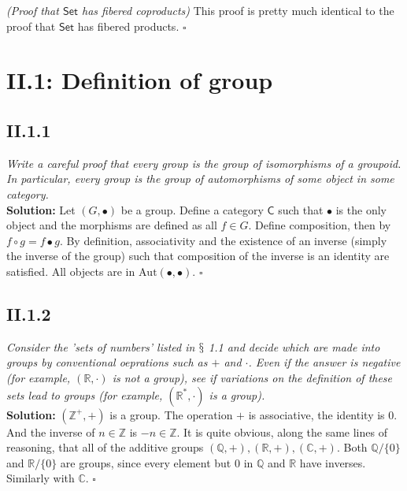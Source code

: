 \documentclass[11pt,a4paper]{article}
\begin{document}
\noindent \textit{(Proof that $\textsf{Set}$ has fibered coproducts)} This proof is pretty much identical to the proof that $\textsf{Set}$ has fibered products. $\square$ 

\newpage

\section*{II.1: Definition of group}

\subsection*{II.1.1} \textit{Write a careful proof that every group is the group of isomorphisms of a groupoid.  In particular, every group is the group of automorphisms of some object in some category.} \\

\noindent \textbf{Solution:} Let $(G, \bullet)$ be a group.  Define a category $\textsf{C}$ such that $\bullet$ is the only object and the morphisms are defined as all $f \in G$.  Define composition, then by $f \circ g = f \bullet g$.  By definition, associativity and the existence of an inverse (simply the inverse of the group) such that composition of the inverse is an identity are satisfied.  All objects are in $\text{Aut}(\bullet,\bullet)$. $\square$ 

\subsection*{II.1.2} \textit{Consider the 'sets of numbers' listed in $\mathsection$ 1.1 and decide which are made into groups by conventional oeprations such as $+$ and $\cdot$.  Even if the answer is negative (for example, $(\mathbb{R}, \cdot)$ is not a group), see if variations on the definition of these sets lead to groups (for example, $(\mathbb{R}^*, \cdot)$ is a group).} \\

\noindent \textbf{Solution: } $(\mathbb{Z}^+, +)$ is a group.  The operation $+$ is associative, the identity is $0$.  And the inverse of $n \in \mathbb{Z}$ is $-n \in \mathbb{Z}$. It is quite obvious, along the same lines of reasoning, that all of the additive groups $(\mathbb{Q}, +),(\mathbb{R},+),(\mathbb{C},+)$. Both $\mathbb{Q}/\{0\}$ and $\mathbb{R}/\{0\}$ are groups, since every element but $0$ in $\mathbb{Q}$ and $\mathbb{R}$ have inverses.  Similarly with  $\mathbb{C}$. $\square$ 
\end{document}
